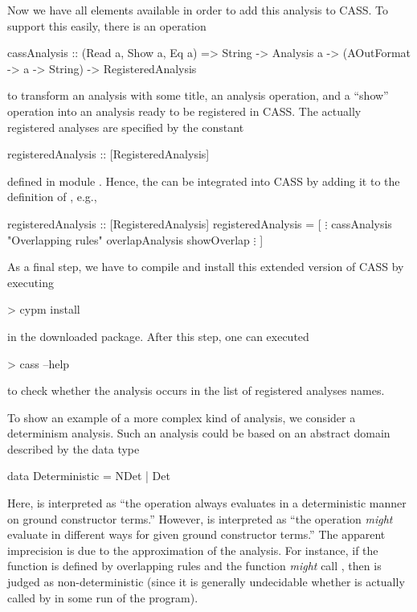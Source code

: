 Now we have all elements available in order to add this analysis to CASS.
To support this easily, there is an operation
%
\begin{curry}
cassAnalysis :: (Read a, Show a, Eq a)
             => String -> Analysis a -> (AOutFormat -> a -> String)
             -> RegisteredAnalysis
\end{curry}
%
to transform an analysis with some title, an analysis operation,
and a ``show'' operation into an analysis ready to be registered in CASS.
The actually registered analyses are specified by the constant
%
\begin{curry}
registeredAnalysis :: [RegisteredAnalysis]
\end{curry}
%
defined in module .
Hence, the  can be integrated into CASS
by adding it to the definition of , e.g.,
%
\begin{curry}
registeredAnalysis :: [RegisteredAnalysis]
registeredAnalysis =
  [
  $\vdots$
  cassAnalysis "Overlapping rules" overlapAnalysis showOverlap
  $\vdots$
  ]
\end{curry}
%
As a final step, we have to compile and install this extended
version of CASS by executing
\begin{curry}
> cypm install
\end{curry}
in the downloaded package. After this step, one can executed
\begin{curry}
> cass --help
\end{curry}
to check whether the  analysis occurs in the list
of registered analyses names.

To show an example of a more complex kind of analysis, we consider
a determinism analysis.
Such an analysis could be based
on an abstract domain described by the data type
\begin{curry}
data Deterministic = NDet | Det
\end{curry}
Here,  is interpreted as ``the operation always evaluates
in a deterministic manner on ground constructor terms.''
However,  is interpreted as ``the operation \emph{might}
evaluate in different ways for given ground constructor terms.''
The apparent imprecision is due to the approximation of the analysis.
For instance, if the function  is defined by overlapping rules
and the function  \emph{might} call , then 
is judged as non-deterministic (since it is generally undecidable
whether  is actually called by  in some run of the
program).

